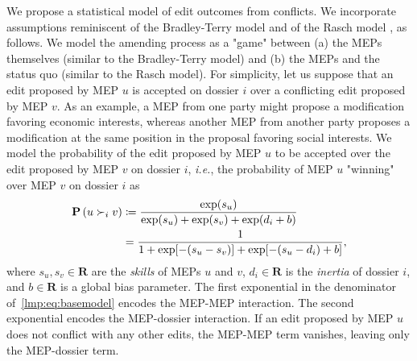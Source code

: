 We propose a statistical model of edit outcomes from conflicts.
We incorporate assumptions reminiscent of the Bradley-Terry model \cite{bradley1952rank} and of the Rasch model \cite{rasch1960probabilistic}, as follows.
We model the amending process as a "game" between (a) the MEPs themselves (similar to the Bradley-Terry model) and (b) the MEPs and the status quo (similar to the Rasch model).
For simplicity, let us suppose that an edit proposed by MEP $u$ is accepted on dossier $i$ over a conflicting edit proposed by MEP $v$.
As an example, a MEP from one party might propose a modification favoring economic interests, whereas another MEP from another party proposes a modification at the same position in the proposal favoring social interests.
We model the probability of the edit proposed by MEP $u$ to be accepted over the edit proposed by MEP $v$ on dossier $i$, \textit{i.e.}, the  probability of MEP $u$ "winning" over MEP $v$ on dossier $i$ as
\begin{align}
	\label{lmp:eq:basemodel}
	\mathbf{P}\left(  u \succ_i v  \right)
	 & \coloneqq \frac{\exp(s_u)}{\exp(s_u) + \exp(s_v) + \exp(d_i + b)} \nonumber \\
	 & = \frac{1}{1 + \exp[ -( s_u - s_v ) ] + \exp[ -( s_u - d_i ) + b ]},
\end{align}
where $ s_u, s_v \in \mathbf{R} $ are the \textit{skills} of MEPs $u$ and $v$, $ d_i \in \mathbf{R} $ is the \textit{inertia} of dossier $i$, and $ b \in \mathbf{R} $ is a global bias parameter.
The first exponential in the denominator of~\eqref{lmp:eq:basemodel} encodes the MEP-MEP interaction.
The second exponential encodes the MEP-dossier interaction.
If an edit proposed by MEP $u$ does not conflict with any other edits, the MEP-MEP term vanishes, leaving only the MEP-dossier term.

